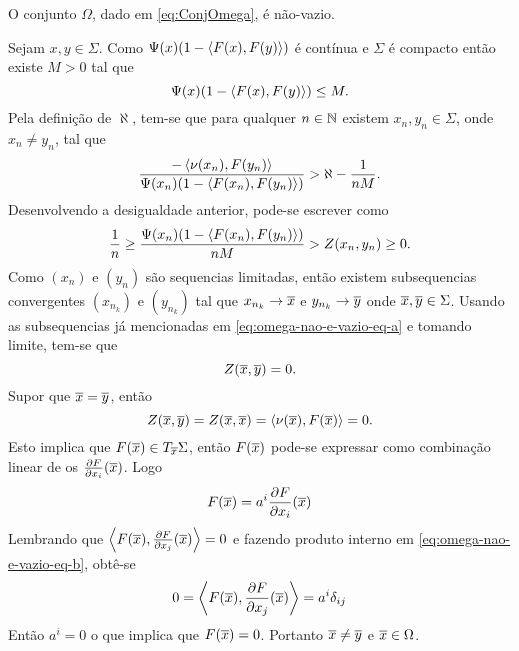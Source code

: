 \begin{lema}
O conjunto $\Omega$, dado em \eqref{eq:ConjOmega}, \'e n\~ao-vazio.
\end{lema}

\begin{demonstracao}
	Sejam $x,y \in \Sigma$. Como
	$\Psi(x) (1 - \left\langle F(x),F(y) \right\rangle)$ é contínua e
	$\Sigma$ é compacto então existe $M > 0$ tal que
	\begin{equation*}
	\Psi(x) (1 - \left\langle F(x),F(y) \right\rangle) \leq M.
	\end{equation*}
	Pela definição de $\aleph$, tem-se
	que para qualquer $n \in \mathbb{N}$ existem $x_n,y_n \in \Sigma$, onde $x_n \neq y_n$, tal que
	\begin{equation*}
	\frac{- \left\langle \nu(x_n),F(y_n) \right\rangle}{\Psi(x_n) (1 - \left\langle F(x_n),F(y_n) \right\rangle)} > \aleph - \frac{1}{nM}.
	\end{equation*}
	Desenvolvendo a desigualdade anterior, pode-se escrever como
	\begin{equation}\label{eq:omega-nao-e-vazio-eq-a}
	\frac{1}{n} \geq \frac{\Psi(x_n) (1 - \left\langle F(x_n),F(y_n) \right\rangle)}{nM} > Z(x_n,y_n) \geq 0.
	\end{equation}
	Como $(x_n)$ e $(y_n)$ são sequencias limitadas, então existem subsequencias convergentes $(x_{n_k})$ e $(y_{n_k})$ tal que
	$x_{n_k} \rightarrow \overline{x}$ e
	$y_{n_k} \rightarrow \overline{y}$
	onde $\overline{x}, \overline{y} \in \Sigma$.
	Usando as subsequencias já mencionadas em \eqref{eq:omega-nao-e-vazio-eq-a} e tomando limite, tem-se que
	\begin{equation*}
	Z(\overline{x},\overline{y}) = 0.
	\end{equation*}
	Supor que $\overline{x} = \overline{y}$, então
	\begin{equation*}
	Z(\overline{x},\overline{y}) = Z(\overline{x}, \overline{x}) = \left\langle \nu(\overline{x}),F(\overline{x}) \right\rangle = 0.
	\end{equation*}
	Esto implica que 
	$F(\overline{x}) \in T_{\overline{x}} \Sigma$,
	então $F(\overline{x})$ pode-se expressar como combinação linear de os $\frac{\partial F}{\partial x_i}(\overline{x})$. Logo
	\begin{equation}\label{eq:omega-nao-e-vazio-eq-b}
	F(\overline{x}) = a^i \frac{\partial F}{\partial x_i}(\overline{x})
	\end{equation}
	Lembrando que
	$\left\langle F(\overline{x}),\frac{\partial F}{\partial x_j}(\overline{x}) \right\rangle = 0$
	e fazendo produto interno em \eqref{eq:omega-nao-e-vazio-eq-b}, obtê-se
	\begin{equation*}
	0 = \left\langle F(\overline{x}),\frac{\partial F}{\partial x_j}(\overline{x}) \right\rangle = a^i \delta_{ij}
	\end{equation*}
	Então
	$a^i = 0$
	o que implica que
	$F(\overline{x}) = 0$.
	Portanto
	$\overline{x} \neq \overline{y}$ e
	$\overline{x} \in \Omega$.
\end{demonstracao}

